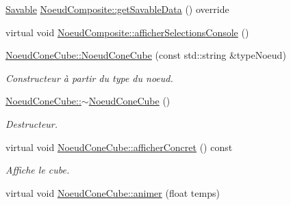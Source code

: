 \begin{DoxyCompactItemize}
\item 
\hyperlink{class_savable}{Savable} \hyperlink{group__inf2990_ga3fefd2b70f384f82cb6319f468c01a63}{Noeud\+Composite\+::get\+Savable\+Data} () override
\item 
virtual void \hyperlink{group__inf2990_ga056eedb917326e84a2a41e726bb2347c}{Noeud\+Composite\+::afficher\+Selections\+Console} ()
\item 
\hyperlink{group__inf2990_ga6f0bcd8b494e8aa6f3a8dad78bad2c0f}{Noeud\+Cone\+Cube\+::\+Noeud\+Cone\+Cube} (const std\+::string \&type\+Noeud)
\begin{DoxyCompactList}\small\item\em Constructeur à partir du type du noeud. \end{DoxyCompactList}\item 
\hyperlink{group__inf2990_ga8db4b36c3469001f7dcfab23debe7d2f}{Noeud\+Cone\+Cube\+::$\sim$\+Noeud\+Cone\+Cube} ()
\begin{DoxyCompactList}\small\item\em Destructeur. \end{DoxyCompactList}\item 
virtual void \hyperlink{group__inf2990_ga4b1f68c409f0b1c5eabd0be7822a36d2}{Noeud\+Cone\+Cube\+::afficher\+Concret} () const 
\begin{DoxyCompactList}\small\item\em Affiche le cube. \end{DoxyCompactList}\item 
\hypertarget{group__inf2990_ga3472a200d45ce3cdff72d72921807b21}{}virtual void \hyperlink{group__inf2990_ga3472a200d45ce3cdff72d72921807b21}{Noeud\+Cone\+Cube\+::animer} (float temps)\label{group__inf2990_ga3472a200d45ce3cdff72d72921807b21}


\end{DoxyCompactItemize}
